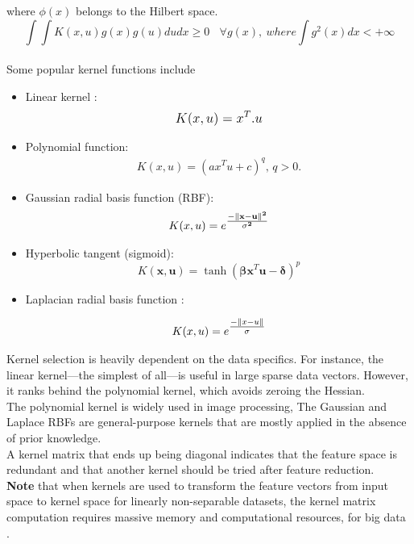 where $\phi(x) $ belongs to the Hilbert space.
\newline
$$\int \int K(x,u) g(x) g(u) du dx \geq 0 \ \ \ \ \forall g(x) , \ where \int g^2(x) dx < +\infty$$
\\
\newline 
Some popular kernel functions include
\newline
\newline


\begin{itemize}

  \item  Linear kernel  : 
  \begin{align*}
  \mathlarger {K(x,u)=  x^{T}.u  }
   \end{align*}
  \item Polynomial function: 
  \begin{align*}
  K(x,u)=(ax^{T}u + c)^{q} ,\, q>0.
  \end{align*}
  \item Gaussian radial basis function (RBF): 
\begin{align*} 
 K(x,u) = e^{\mathlarger{\frac{\mathbf{-\| x -  u\|^2}}{\mathbf{\sigma^2} } }}
\end{align*}
   
  \item  Hyperbolic tangent (sigmoid):
    \begin{equation}
      K(\mathbf x, \mathbf u) = \tanh(\mathbf {\beta} \mathbf x^{T} \mathbf u - \mathbf{\delta})^p
    \end{equation}
    
    \item Laplacian radial basis function : 
    
    \begin{align*} 
      K(x,u) = e^{\mathlarger{\frac{-\| x -  u\|}{\sigma} } }
     \end{align*}
    
\end{itemize}

Kernel selection is heavily dependent on the data specifics. For instance, the linear kernel—the simplest
of all—is useful in large sparse data vectors. However, it ranks behind the polynomial kernel, which avoids
zeroing the Hessian. \\The polynomial kernel is widely used in image processing, The Gaussian and Laplace RBFs are general-purpose kernels
that are mostly applied in the absence of prior knowledge. \\A kernel matrix that ends up being diagonal indicates that the feature space is redundant and that another kernel should be tried after feature reduction.\\
\newline
\newline
\textbf{
Note} that when kernels are used to transform the feature vectors from input space to kernel space for linearly non-separable datasets, the kernel matrix computation requires massive memory and computational
resources, for big data . 

